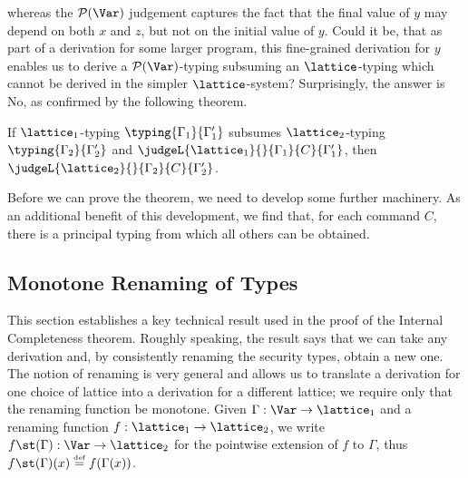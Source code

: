 \documentclass{sigplanconf}
\newcommand{\pset}{\mathcal{P}}
\newcommand{\eqdef}{\mathrel{\stackrel{{\scriptscriptstyle\mathrm{def}}}{=}}}
\begin{document}
whereas
the $\pset(\Var)$ judgement captures the fact
that the final value of $y$ may depend on both $x$ and $z$, but not on the initial value of $y$.
Could it be, that as part of a derivation for some larger program,
this fine-grained derivation for $y$
enables us to derive
a $\pset(\Var)$-typing subsuming an $\lattice$-typing which cannot be derived in the simpler
$\lattice$-system?
Surprisingly, the answer is No, as confirmed by the following theorem.
\begin{theorem}\label{theorem:internalcompleteness}
        If $\lattice_1$-typing $\typing{\Gamma_1}{\Gamma'_1}$ subsumes
        $\lattice_2$-typing $\typing{\Gamma_2}{\Gamma'_2}$
        and $\judgeL{\lattice_1}{}{\Gamma_1}{C}{\Gamma'_1}$, then
    $\judgeL{\lattice_2}{}{\Gamma_2}{C}{\Gamma'_2}$.
\end{theorem}
Before we can prove the theorem, we need to develop some further machinery.
As an additional benefit of this development, we find that,
for each command $C$, there is a principal typing
from which all others can be obtained.

\subsection{Monotone Renaming of Types}
This section establishes a key technical result used in the proof of the Internal Completeness theorem.
Roughly speaking, the result says that we can take any derivation and, by consistently
renaming the security types, obtain a new one. The notion of renaming is very
general and allows us to translate a derivation for one choice
of lattice into a derivation for a different lattice;
we require only that the renaming function be monotone.
Given $\Gamma: \Var -> \lattice_1$ and a renaming
function $f: \lattice_1 -> \lattice_2$, we write $f\st(\Gamma): \Var -> \lattice_2$
for the pointwise extension of $f$ to $\Gamma$, thus
$f\st(\Gamma)(x) \eqdef f(\Gamma(x))$.
\end{document}
